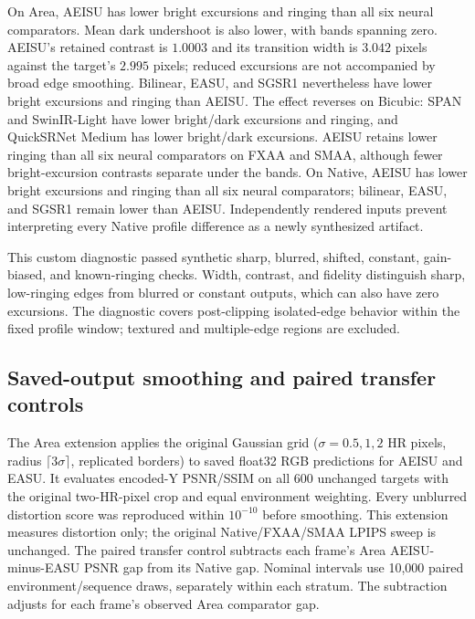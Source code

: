\documentclass[10pt,twocolumn,letterpaper]{article}
\begin{document}


On Area, AEISU has lower bright excursions and ringing than all six neural comparators.
Mean dark undershoot is also lower, with bands spanning zero.
AEISU's retained contrast is $1.0003$ and its transition width is $3.042$ pixels against the target's $2.995$ pixels; reduced excursions are not accompanied by broad edge smoothing.
Bilinear, EASU, and SGSR1 nevertheless have lower bright excursions and ringing than AEISU.
The effect reverses on Bicubic: SPAN and SwinIR-Light have lower bright/dark excursions and ringing, and QuickSRNet Medium has lower bright/dark excursions.
AEISU retains lower ringing than all six neural comparators on FXAA and SMAA, although fewer bright-excursion contrasts separate under the bands.
On Native, AEISU has lower bright excursions and ringing than all six neural comparators; bilinear, EASU, and SGSR1 remain lower than AEISU.
Independently rendered inputs prevent interpreting every Native profile difference as a newly synthesized artifact.

This custom diagnostic passed synthetic sharp, blurred, shifted, constant, gain-biased, and known-ringing checks.
Width, contrast, and fidelity distinguish sharp, low-ringing edges from blurred or constant outputs, which can also have zero excursions.
The diagnostic covers post-clipping isolated-edge behavior within the fixed profile window; textured and multiple-edge regions are excluded.

\subsection{Saved-output smoothing and paired transfer controls}
\label{sec:saved-controls}
The Area extension applies the original Gaussian grid ($\sigma=0.5,1,2$ HR pixels, radius $\lceil3\sigma\rceil$, replicated borders) to saved float32 RGB predictions for AEISU and EASU.
It evaluates encoded-Y PSNR/SSIM on all 600 unchanged targets with the original two-HR-pixel crop and equal environment weighting.
Every unblurred distortion score was reproduced within $10^{-10}$ before smoothing.
This extension measures distortion only; the original Native/FXAA/SMAA LPIPS sweep is unchanged.
The paired transfer control subtracts each frame's Area AEISU-minus-EASU PSNR gap from its Native gap.
Nominal intervals use 10,000 paired environment/sequence draws, separately within each stratum.
The subtraction adjusts for each frame's observed Area comparator gap.
\end{document}
